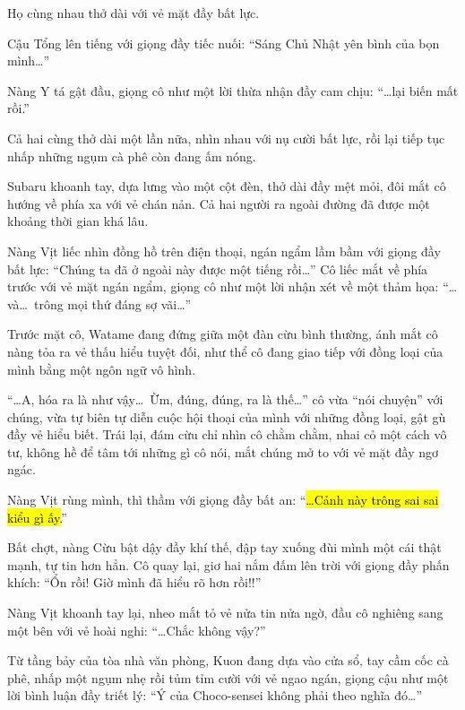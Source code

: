 \documentclass[../main.tex]{subfiles}
\begin{document}
Họ cùng nhau thở dài với vẻ mặt đầy bất lực.

Cậu Tổng lên tiếng với giọng đầy tiếc nuối: ``Sáng Chủ Nhật yên bình của bọn mình\dots''

Nàng Y tá gật đầu, giọng cô như một lời thừa nhận đầy cam chịu: ``\dots lại biến mất rồi.''

Cả hai cùng thở dài một lần nữa, nhìn nhau với nụ cười bất lực, rồi lại tiếp tục nhấp những ngụm cà phê còn đang ấm nóng.

\ct

Subaru khoanh tay, dựa lưng vào một cột đèn, thở dài đầy mệt mỏi, đôi mắt cô hướng về phía xa với vẻ chán nản. Cả hai người ra ngoài đường đã được một khoảng thời gian khá lâu.

Nàng Vịt liếc nhìn đồng hồ trên điện thoại, ngán ngẩm lầm bầm với giọng đầy bất lực: ``Chúng ta đã ở ngoài này được một tiếng rồi\dots'' Cô liếc mắt về phía trước với vẻ mặt ngán ngẩm, giọng cô như một lời nhận xét về một thảm họa: ``\dots và\dots\ trông mọi thứ đáng sợ vãi\dots''

Trước mặt cô, Watame đang đứng giữa một đàn cừu bình thường, ánh mắt cô nàng tỏa ra vẻ thấu hiểu tuyệt đối, như thể cô đang giao tiếp với đồng loại của mình bằng một ngôn ngữ vô hình.


``\dots A, hóa ra là như vậy\dots\ Ừm, đúng, đúng, ra là thế\dots'' cô vừa ``nói chuyện'' với chúng, vừa tự biên tự diễn cuộc hội thoại của mình với những đồng loại, gật gù đầy vẻ hiểu biết. Trái lại, đám cừu chỉ nhìn cô chằm chằm, nhai cỏ một cách vô tư, không hề để tâm tới những gì cô nói, mắt chúng mở to với vẻ mặt đầy ngơ ngác.

Nàng Vịt rùng mình, thì thầm với giọng đầy bất an: ``\hl{\dots Cảnh này trông sai sai kiểu gì ấy.}''

Bất chợt, nàng Cừu bật dậy đầy khí thế, đập tay xuống đùi mình một cái thật mạnh, tự tin hơn hẳn. Cô quay lại, giơ hai nắm đấm lên trời với giọng đầy phấn khích: ``Ổn rồi! Giờ mình đã hiểu rõ hơn rồi!!''

Nàng Vịt khoanh tay lại, nheo mắt tỏ vẻ nửa tin nửa ngờ, đầu cô nghiêng sang một bên với vẻ hoài nghi: ``\dots Chắc không vậy?''

Từ tầng bảy của tòa nhà văn phòng, Kuon đang dựa vào cửa sổ, tay cầm cốc cà phê, nhấp một ngụm nhẹ rồi tủm tỉm cười với vẻ ngao ngán, giọng cậu như một lời bình luận đầy triết lý: ``Ý của Choco-sensei không phải theo nghĩa đó\dots''

\il
\end{document}
